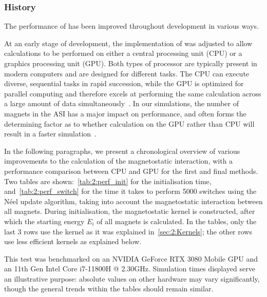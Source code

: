 \subsubsection{History}
The performance of \hotspice has been improved throughout development in various ways. \par
At an early stage of development, the implementation of \hotspice was adjusted to allow calculations to be performed on either a central processing unit (CPU) or a graphics processing unit (GPU).
Both types of processor are typically present in modern computers and are designed for different tasks.
The CPU can execute diverse, sequential tasks in rapid succession, while the GPU is optimized for parallel computing and therefore excels at performing the same calculation across a large amount of data simultaneously~\cite{owens2008gpu}.
In our simulations, the number of magnets in the ASI has a major impact on performance, and often forms the determining factor as to whether calculation on the GPU rather than CPU will result in a faster simulation~\cite{lee2010debunking}. \par
In the following paragraphs, we present a chronological overview of various improvements to the calculation of the magnetostatic interaction, with a performance comparison between CPU and GPU for the first and final methods.
Two tables are shown:~\cref{tab:2:perf_init} for the initialisation time, and~\cref{tab:2:perf_switch} for the time it takes to perform 5000 switches using the N\'eel update algorithm, taking into account the magnetostatic interaction between all magnets.
During initialisation, the magnetostatic kernel is constructed, after which the starting energy $E_i$ of all magnets is calculated.
In the tables, only the last 3 rows use the kernel as it was explained in~\cref{sec:2:Kernels}; the other rows use less efficient kernels as explained below. \par %
This test was benchmarked on an NVIDIA GeForce RTX 3080 Mobile GPU and an 11th Gen Intel\textregistered{} Core\texttrademark{} i7-11800H @ 2.30GHz.
Simulation times displayed serve an illustrative purpose: absolute values on other hardware may vary significantly, though the general trends within the tables should remain similar.

